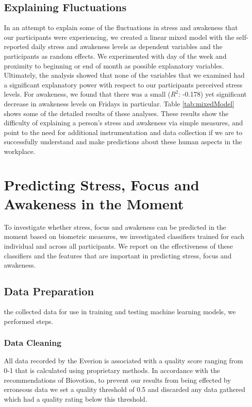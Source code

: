 \subsection{Explaining Fluctuations}
In an attempt to explain some of the fluctuations in stress and awakeness that our participants were experiencing, we created a linear mixed model with the self-reported daily stress and awakeness levels as dependent variables and the participants as random effects. We experimented with day of the week and proximity to beginning or end of month as possible explanatory variables. Ultimately, the analysis showed that none of the variables that we examined had a significant explanatory power with respect to our participants perceived stress levels.
For awakeness, we found  that there was a small ($R^2$: -0.178) yet significant decrease in awakeness levels on Fridays in particular. Table \ref{tab:mixedModel} shows some of the detailed results of these analyses. These results show the difficulty of explaining a person's stress and awakeness via simple measures, and point to the need for additional instrumentation and data collection if we are to successfully understand and make predictions about these human aspects in the workplace.




\section{Predicting Stress, Focus and Awakeness in the Moment}
\label{secOverallAccuracy}

To investigate whether stress, focus and awakeness can be predicted in
the moment based on biometric measures,
we investigated classifiers trained
for each individual and across all participants. We report on the effectiveness of
these classifiers and the features that are important in predicting stress, focus
and awakeness.

\subsection{Data Preparation}

 the collected data for use in training and testing  machine learning models, we performed  steps.


\subsubsection{Data Cleaning}
All data recorded by the Everion is associated with a quality score ranging from 0-1 that is calculated using proprietary methods. In accordance with the recommendations of Biovotion,
to prevent our results from being effected by erroneous data we set a quality threshold of 0.5 and discarded any data gathered which had a quality rating below this threshold. 


